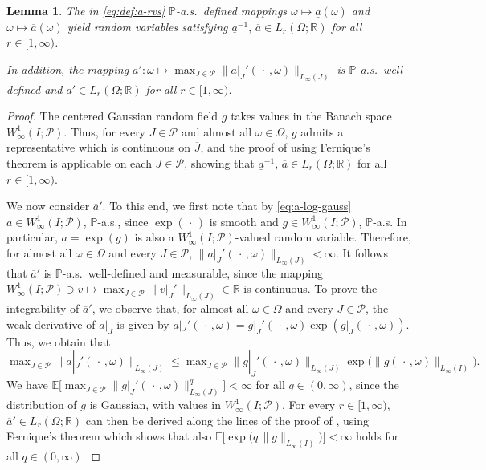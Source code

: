 \documentclass[reqno]{amsart}
\numberwithin{equation}{section}
\newcommand{\bbE}{\mathbb{E}}
\newcommand{\bbP}{\mathbb{P}}
\newcommand{\bbR}{\mathbb{R}}
\newcommand{\cP}{\mathcal{P}}
\newcommand{\norm}[2]{     \| #1       \|_{ #2 }}
\newtheorem{lemma}{Lemma}[section]
\theoremstyle{remark}
\theoremstyle{definition}
\begin{document}
\begin{lemma}\label{lem:integrability-a-rvs} 
	The in \eqref{eq:def:a-rvs} $\bbP$-a.s.\ defined 
	mappings $\omega\mapsto\underline{a}(\omega)$ and  
	${\omega\mapsto\overline{a}(\omega)}$ 
	yield random variables satisfying 
	$\underline{a}^{-1}\!, \, \overline{a}\in L_r(\Omega;\bbR)$ 
	for all $r\in[1,\infty)$. 
	
	In addition, the mapping 
	$\overline{a}'\! : 
	\omega \mapsto 
	\max\nolimits_{J\in\cP} 
	\norm{ a|_J'(\,\cdot\,, \omega) }{L_\infty(J)}$
	is $\bbP$-a.s.\ well-defined and 
	$\overline{a}' \in L_r(\Omega;\bbR)$ 
	for all $r\in[1,\infty)$. 
\end{lemma}

\begin{proof}
	The centered Gaussian random field $g$ 
	takes values in the Banach space 
	$W^1_\infty(I;\cP)$.  
	Thus, for every $J\in\cP$ and almost all $\omega\in\Omega$, 
	$g$ admits a representative 
	which is continuous 
	on $\overline{J}$, 
	and  
	the proof of \cite[Proposition~2.3]{Charrier2012}
	using Fernique's theorem is applicable on each $J\in\cP$, 
	showing that 
	$\underline{a}^{-1}\!, \, \overline{a} \in L_r(\Omega;\bbR)$ 
	for all ${r\in[1,\infty)}$. 
	
	We now consider $\overline{a}'$\!. 
	To this end, we first note that by \eqref{eq:a-log-gauss} 
	$a\in W^1_\infty(I;\cP)$, $\bbP$-a.s., 
	since $\exp(\,\cdot\,)$ is smooth and 
	$g\in W^1_\infty(I;\cP)$, $\bbP$-a.s. 
	In particular, $a = \exp(g)$ is also a 
	$W^1_\infty(I;\cP)$-valued random variable.
	Therefore, for almost all ${\omega\in\Omega}$ and 
	every $J\in\cP$, 
	$\norm{ a|_J'(\,\cdot\,, \omega) }{L_\infty(J)} < \infty$. 
	It follows that $\overline{a}'$ is $\bbP$-a.s.\ well-defined 
	and measurable, since the 
	mapping 
	${W^1_\infty(I;\cP) \ni v \mapsto \max_{J\in\cP} 
		\norm{ v|_J' }{L_\infty(J)} \in\bbR}$  
	is continuous. 
	To prove the integrability of $\overline{a}'$\!, 
	we observe that, 
	for almost all $\omega\in\Omega$ and every $J\in\cP$, 
	the weak derivative of $a|_J$ is given by 
	$a|_J'(\,\cdot\,, \omega)
	= 
	g|_J'(\,\cdot\,, \omega)
	\exp(g|_J(\,\cdot\,, \omega))$.
	Thus, we obtain that 
	\[ 
	\max\nolimits_{J\in\cP}
	\norm{a|_J'(\,\cdot\,, \omega)}{L_\infty(J)}
	\leq 
	\max\nolimits_{J\in\cP}
	\norm{g|_J'(\,\cdot\,, \omega)}{L_\infty(J)} 
	\exp\bigl( \norm{g(\,\cdot\,, \omega)}{L_\infty(I)} \bigr). 
	\] 
	We have 
	$\bbE\bigl[ 
	\max\nolimits_{J\in\cP}
	\norm{g|_J'(\,\cdot\,, \omega)}{L_\infty(J)}^q \bigr] < \infty$ 
	for all $q\in(0,\infty)$, 
	since the distribution of $g$ 
	is Gaussian, with values in $W^1_\infty(I;\cP)$. 
	For every $r\in[1,\infty)$, 
	${\overline{a}'\in L_r(\Omega;\bbR)}$ 
	can then be derived along the lines 
	of the proof of \cite[Proposition~2.3]{Charrier2012},  
	using Fernique's theorem 
	which shows that also 
	$\bbE\bigl[ 
	\exp\bigl( q \, \norm{g}{L_\infty(I)} \bigr) 
	\bigr] < \infty$ holds for all ${q\in(0,\infty)}$.
\end{proof}
\end{document}
